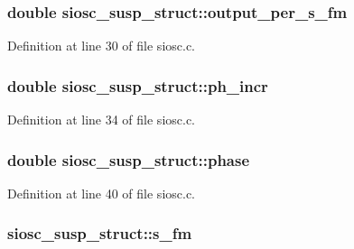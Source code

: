 \subsubsection[{\texorpdfstring{output\+\_\+per\+\_\+s\+\_\+fm}{output_per_s_fm}}]{\setlength{\rightskip}{0pt plus 5cm}double siosc\+\_\+susp\+\_\+struct\+::output\+\_\+per\+\_\+s\+\_\+fm}\hypertarget{structsiosc__susp__struct_a5d4195dead9c137e6e50e4864cfeb966}{}\label{structsiosc__susp__struct_a5d4195dead9c137e6e50e4864cfeb966}


Definition at line 30 of file siosc.\+c.

\subsubsection[{\texorpdfstring{ph\+\_\+incr}{ph_incr}}]{\setlength{\rightskip}{0pt plus 5cm}double siosc\+\_\+susp\+\_\+struct\+::ph\+\_\+incr}\hypertarget{structsiosc__susp__struct_a66b08fed7f1ccce476dd97000eb1fcd0}{}\label{structsiosc__susp__struct_a66b08fed7f1ccce476dd97000eb1fcd0}


Definition at line 34 of file siosc.\+c.

\subsubsection[{\texorpdfstring{phase}{phase}}]{\setlength{\rightskip}{0pt plus 5cm}double siosc\+\_\+susp\+\_\+struct\+::phase}\hypertarget{structsiosc__susp__struct_a225ea78527ce0ef59a41601e6f7648c4}{}\label{structsiosc__susp__struct_a225ea78527ce0ef59a41601e6f7648c4}


Definition at line 40 of file siosc.\+c.

\subsubsection[{\texorpdfstring{s\+\_\+fm}{s_fm}}]{ siosc\+\_\+susp\+\_\+struct\+::s\+\_\+fm}\hypertarget{structsiosc__susp__struct_ab04fa2b72177133df8b03caa45439573}{}\label{structsiosc__susp__struct_ab04fa2b72177133df8b03caa45439573}


